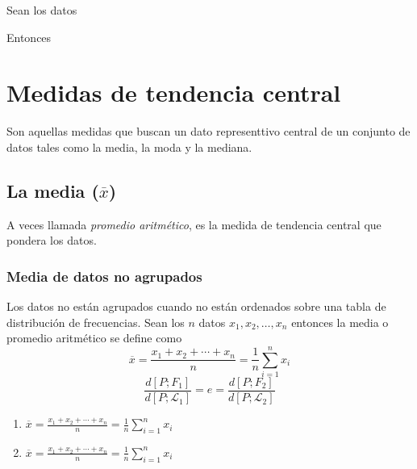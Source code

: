 \documentclass[10pt,]{krantz}
\providecommand{\tightlist}{%
  \setlength{\itemsep}{0pt}\setlength{\parskip}{0pt}}
\theoremstyle{definition}
\theoremstyle{definition}
\theoremstyle{definition}
\theoremstyle{remark}
\let\BeginKnitrBlock\begin \let\EndKnitrBlock\end
\begin{document}
\BeginKnitrBlock{exercise}
\protect\hypertarget{exr:unnamed-chunk-1}{}{\label{exr:unnamed-chunk-1} }Sean los datos
\EndKnitrBlock{exercise}

\BeginKnitrBlock{solution}
\iffalse{} {Solución. } \fi{}Entonces
\EndKnitrBlock{solution}

\hypertarget{medidas-de-tendencia-central}{%
\chapter{Medidas de tendencia central}\label{medidas-de-tendencia-central}}

Son aquellas medidas que buscan un dato representtivo central de un conjunto de datos tales como la media, la moda y la mediana.

\hypertarget{la-media-overlinex}{%
\section{\texorpdfstring{La media (\(\overline{x}\))}{La media (\textbackslash{}overline\{x\})}}\label{la-media-overlinex}}

A veces llamada \emph{promedio aritmético}, es la medida de tendencia central que pondera los datos.

\hypertarget{media-de-datos-no-agrupados}{%
\subsection{Media de datos no agrupados}\label{media-de-datos-no-agrupados}}

Los datos no están agrupados cuando no están ordenados sobre una tabla de distribución de frecuencias. Sean los \(n\) datos \(x_1, x_2,\ldots, x_n\) entonces la media o promedio aritmético se define como
\begin{equation}
\overline{x}=\frac{x_1+x_2+\cdots+x_n}{n}=\frac{1}{n}\sum_{i=1}^nx_i
\label{eq:w1}
\end{equation}
\begin{equation}
\frac{d\left[P;F_1\right]}{d\left[P;\mathcal{L}_1\right]}=e=\frac{d\left[P;F_2\right]}{d\left[P;\mathcal{L}_2\right]}
\label{eq:ww}
\end{equation}

\begin{enumerate}
\def\labelenumi{\arabic{enumi}.}
\tightlist
\item
  \(\overline{x}=\frac{x_1+x_2+\cdots+x_n}{n}=\frac{1}{n}\sum_{i=1}^nx_i\)
\item
  \(\overline{x}=\frac{x_1+x_2+\cdots+x_n}{n}=\frac{1}{n}\sum_{i=1}^nx_i\)
\end{enumerate}
\end{document}
